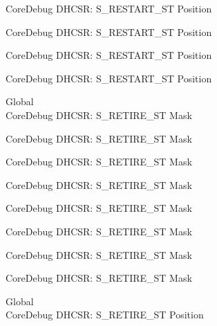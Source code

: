 \begin{DoxyRefList}
\label{deprecated__deprecated000303}%
%
Core\+Debug DHCSR\+: S\+\_\+\+RESTART\+\_\+\+ST Position 

\label{deprecated__deprecated000379}%
%
Core\+Debug DHCSR\+: S\+\_\+\+RESTART\+\_\+\+ST Position 

\label{deprecated__deprecated000458}%
%
Core\+Debug DHCSR\+: S\+\_\+\+RESTART\+\_\+\+ST Position 

\label{deprecated__deprecated000560}%
%
Core\+Debug DHCSR\+: S\+\_\+\+RESTART\+\_\+\+ST Position  
\item[Global \doxylink{group___c_m_s_i_s___core_debug_ga89dceb5325f6bcb36a0473d65fbfcfa6}{Core\+Debug\+\_\+\+DHCSR\+\_\+\+S\+\_\+\+RETIRE\+\_\+\+ST\+\_\+\+Msk} ]\hfill \\
\label{deprecated__deprecated000012}%
%
Core\+Debug DHCSR\+: S\+\_\+\+RETIRE\+\_\+\+ST Mask 

\label{deprecated__deprecated000112}%
%
Core\+Debug DHCSR\+: S\+\_\+\+RETIRE\+\_\+\+ST Mask 

\label{deprecated__deprecated000166}%
%
Core\+Debug DHCSR\+: S\+\_\+\+RETIRE\+\_\+\+ST Mask 

\label{deprecated__deprecated000251}%
%
Core\+Debug DHCSR\+: S\+\_\+\+RETIRE\+\_\+\+ST Mask 

\label{deprecated__deprecated000308}%
%
Core\+Debug DHCSR\+: S\+\_\+\+RETIRE\+\_\+\+ST Mask 

\label{deprecated__deprecated000384}%
%
Core\+Debug DHCSR\+: S\+\_\+\+RETIRE\+\_\+\+ST Mask 

\label{deprecated__deprecated000463}%
%
Core\+Debug DHCSR\+: S\+\_\+\+RETIRE\+\_\+\+ST Mask 

\label{deprecated__deprecated000565}%
%
Core\+Debug DHCSR\+: S\+\_\+\+RETIRE\+\_\+\+ST Mask  
\item[Global \doxylink{group___c_m_s_i_s___core_debug_ga2328118f8b3574c871a53605eb17e730}{Core\+Debug\+\_\+\+DHCSR\+\_\+\+S\+\_\+\+RETIRE\+\_\+\+ST\+\_\+\+Pos} ]\hfill \\
\label{deprecated__deprecated000011}%
%
Core\+Debug DHCSR\+: S\+\_\+\+RETIRE\+\_\+\+ST Position 


\end{DoxyRefList}
